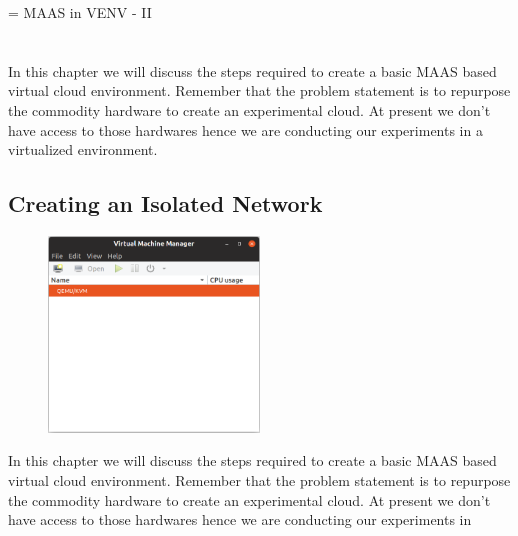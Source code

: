 \chapname = {MAAS in VENV - II}

\chapter{\the\chapname}

In this chapter we will discuss the steps required to create a basic MAAS based virtual cloud environment. Remember that the problem statement is to repurpose the commodity hardware to create an experimental cloud. At present we don't have access to those hardwares hence we are conducting our experiments in a virtualized environment. 

\section{Creating an Isolated Network}

\begin{figure}[!h]
    \centering
    \includegraphics[width=0.5\textwidth]{images/qemu.png}
\end{figure}


In this chapter we will discuss the steps required to create a basic MAAS based virtual cloud environment. Remember that the problem statement is to repurpose the commodity hardware to create an experimental cloud. At present we don't have access to those hardwares hence we are conducting our experiments in 